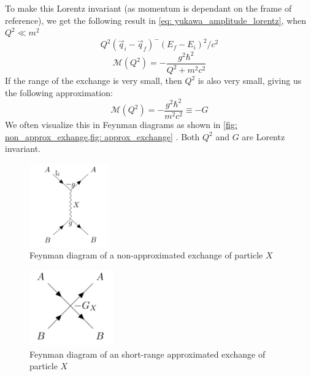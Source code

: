 To make this Lorentz invariant (as momentum is dependant on the frame of reference), we get the following result in \cref{eq: yukawa_amplitude_lorentz}, when $Q^2 ≪ m^2$
\begin{equation}
  Q^2 (\vec{q}_i - \vec{q}_f)^ - (E_f - E_i)^2 / c^2
\end{equation}
\begin{equation}\label{eq: yukawa_amplitude_lorentz}
  \mathcal{M}(Q^2) = - \frac{g^2 ℏ^2}{Q^2 + m^2c^2}
\end{equation}
If the range of the exchange is very small, then $Q^2$ is also very small, giving us the following approximation:
\begin{equation}
  \mathcal{M}(Q^2) = - \frac{g^2 ℏ^2}{m^2c^2} ≡ -G
\end{equation}
We often visualize this in Feynman diagrams as shown in \cref{fig: non_approx_exhange,fig: approx_exchange} . Both $Q^2$ and $G$ are Lorentz invariant. 
\begin{figure}[h!]
\centering
\includegraphics[width = .35\textwidth]{non_approx_exhange.png}
\caption{Feynman diagram of a non-approximated exchange of particle $X$}
\label{fig: non_approx_exhange}
\end{figure}

\begin{figure}[h!]
\centering
\includegraphics[width = .35\textwidth]{approx_exchange.png}
\caption{Feynman diagram of an short-range approximated exchange of particle $X$}
\label{fig: approx_exchange}
\end{figure}


